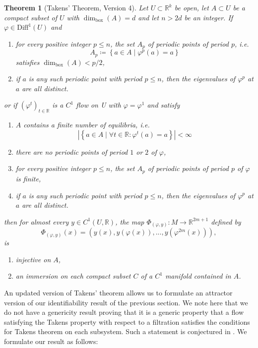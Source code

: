 \documentclass[11pt, a4paper]{memoir}
\theoremstyle{break}
\newtheorem{thm}{Theorem}
\theoremstyle{break}
\theoremstyle{nonumberplain}
\newcommand{\mR}{\mathbb{R}}
\newcommand{\abs}[1]{\left| #1\right|}
\begin{document}
\begin{thm}[Takens' Theorem, Version 4]\label{v4}
Let $U\subset \mR^k$ be open, let $A\subset U$ be a compact subset of $U$ with $\dim_\text{box}(A)=d$ and let $n>2d$ be an integer. If $\varphi\in\text{Diff}^1(U)$ and
\begin{enumerate}[label=\arabic*)]
	\item for every positive integer $p\leqslant n$, the set $A_p$ of periodic points of period $p$, i.e.
	$$A_p\coloneqq \left\{a\in A\mid \varphi^p(a)=a\right\}$$
	satisfies $\dim_\text{box}(A)<p/2$,
	\item if $a$ is any such periodic point with period $p\leqslant n$, then the eigenvalues of $\varphi^p$ at $a$ are all distinct.
\end{enumerate}
or if $(\varphi^t)_{t\in \mR}$ is a $C^1$ flow on U with $\varphi=\varphi^1$ and satisfy
\begin{enumerate}[label=\arabic*)]
	\item $A$ contains a finite number of equilibria, i.e.
	$$\abs{\left\{a\in A\mid \forall
	 t\in \mR: \varphi^t(a)=a\right\}}<\infty$$
	 \item there are no periodic points of period $1$ or $2$ of $\varphi$,
	\item for every positive integer $p\leqslant n$, the set $A_p$ of periodic points of period $p$ of $\varphi$ is finite,
	\item if $a$ is any such periodic point with period $p\leqslant n$, then the eigenvalues of $\varphi^p$ at $a$ are all distinct.
\end{enumerate}
then for almost every $y\in C^1(U,\mR)$, the map $\Phi_{(\varphi,y)}:M\to \mathbb{R}^{2m+1}$ defined by
$$\Phi_{(\varphi,y)}(x)=(y(x),y(\varphi(x)),...,y(\varphi^{2m}(x))),$$
is
\begin{enumerate}[label=\roman*)]
	\item injective on $A$,
	\item an immersion on each compact subset $C$ of a $C^1$ manifold contained in $A$.
\end{enumerate}
\end{thm} 
An updated version of Takens' theorem allows us to formulate an attractor version of our identifiability result of the previous section. We note here that we do not have a genericity result proving that it is a generic property that a flow satisfying the Takens property with respect to a filtration satisfies the conditions for Takens theorem on each subsystem. Such a statement is conjectured in \cite{mathFound}. We formulate our result as follows:
\end{document}
